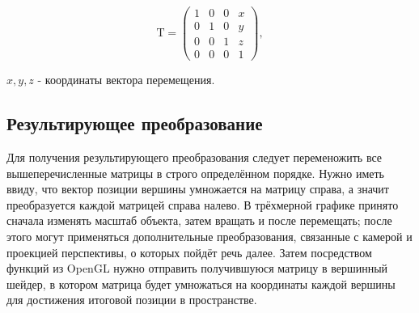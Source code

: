 \begin{equation}
\mathrm{T} = 
  \begin{pmatrix}
    1 & 0  & 0 & x\\
    0 & 1 & 0 & y\\
    0 & 0 & 1 & z\\
      0 & 0 & 0 & 1
  \end{pmatrix},
\end{equation}
\begin{eqrem}
\begin{math} x, y, z \end{math} - координаты вектора перемещения.
\end{eqrem}

\subsection{Результирующее преобразование}
Для получения результирующего преобразования следует переменожить все вышеперечисленные матрицы 
в строго определённом порядке. Нужно иметь ввиду, что вектор позиции вершины умножается на матрицу справа, 
а значит преобразуется каждой матрицей справа налево. В трёхмерной графике принято сначала изменять масштаб объекта, 
затем вращать и после перемещать; после этого могут применяться дополнительные преобразования, связанные с камерой 
и проекцией перспективы, о которых пойдёт речь далее. Затем посредством функций из OpenGL нужно отправить получившуюся 
матрицу в вершинный шейдер, в котором матрица будет умножаться на координаты каждой вершины для достижения итоговой 
позиции в пространстве.